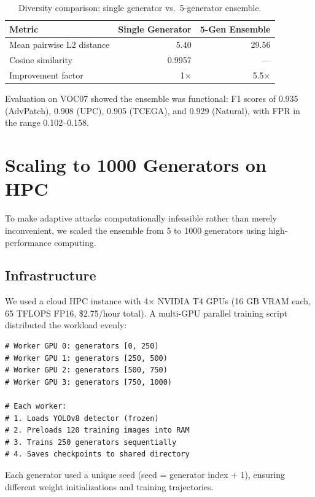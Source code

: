 \documentclass[11pt,a4paper]{article}
\begin{document}
\begin{table}[H]
\centering
\caption{Diversity comparison: single generator vs.\ 5-generator ensemble.}
\begin{tabular}{lrr}
\toprule
\textbf{Metric} & \textbf{Single Generator} & \textbf{5-Gen Ensemble} \\
\midrule
Mean pairwise L2 distance & 5.40 & 29.56 \\
Cosine similarity & 0.9957 & --- \\
Improvement factor & 1$\times$ & 5.5$\times$ \\
\bottomrule
\end{tabular}
\end{table}

Evaluation on VOC07 showed the ensemble was functional: F1 scores of 0.935 (AdvPatch), 0.908 (UPC), 0.905 (TCEGA), and 0.929 (Natural), with FPR in the range 0.102--0.158.

\section{Scaling to 1000 Generators on HPC}

To make adaptive attacks computationally infeasible rather than merely inconvenient, we scaled the ensemble from 5 to 1000 generators using high-performance computing.

\subsection{Infrastructure}

We used a cloud HPC instance with 4$\times$ NVIDIA T4 GPUs (16 GB VRAM each, 65 TFLOPS FP16, \$2.75/hour total). A multi-GPU parallel training script distributed the workload evenly:

\begin{lstlisting}[caption={Parallel training: 4 workers, 250 generators each.}]
# Worker GPU 0: generators [0, 250)
# Worker GPU 1: generators [250, 500)
# Worker GPU 2: generators [500, 750)
# Worker GPU 3: generators [750, 1000)

# Each worker:
# 1. Loads YOLOv8 detector (frozen)
# 2. Preloads 120 training images into RAM
# 3. Trains 250 generators sequentially
# 4. Saves checkpoints to shared directory
\end{lstlisting}

Each generator used a unique seed (seed = generator index + 1), ensuring different weight initializations and training trajectories.
\end{document}

